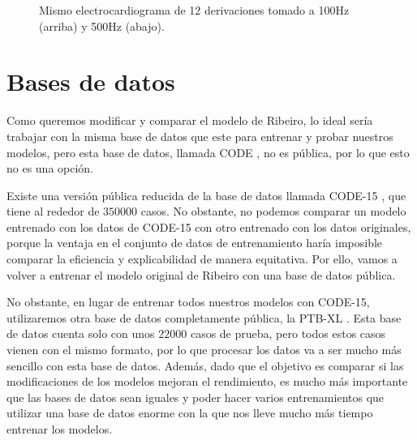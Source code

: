 \begin{figure}
	\setlength{\fboxsep}{0pt}%
	\caption{Mismo electrocardiograma de 12 derivaciones tomado a 100Hz (arriba) y 500Hz (abajo).}
	\label{fig:ecg12}
\end{figure}

\section{Bases de datos}
Como queremos modificar y comparar el modelo de Ribeiro, lo ideal sería trabajar con la misma base de datos que este para entrenar y probar nuestros modelos, pero esta base de datos, llamada CODE \citep{code}, no es pública, por lo que esto no es una opción.

Existe una versión pública reducida de la base de datos llamada CODE-15 \citep{code15}, que tiene al rededor de $350000$ casos. No obstante, no podemos comparar un modelo entrenado con los datos de CODE-15 con otro entrenado con los datos originales, porque la ventaja en el conjunto de datos de entrenamiento haría imposible comparar la eficiencia y explicabilidad de manera equitativa. Por ello, vamos a volver a entrenar el modelo original de Ribeiro con una base de datos pública.

No obstante, en lugar de entrenar todos nuestros modelos con CODE-15, utilizaremos otra base de datos completamente pública, la PTB-XL \citep{ptbxldb}. Esta base de datos cuenta solo con unos $22000$ casos de prueba, pero todos estos casos vienen con el mismo formato, por lo que procesar los datos va a ser mucho más sencillo con esta base de datos. Además, dado que el objetivo es comparar si las modificaciones de los modelos mejoran el rendimiento, es mucho más importante que las bases de datos sean iguales y poder hacer varios entrenamientos que utilizar una base de datos enorme con la que nos lleve mucho más tiempo entrenar los modelos.

